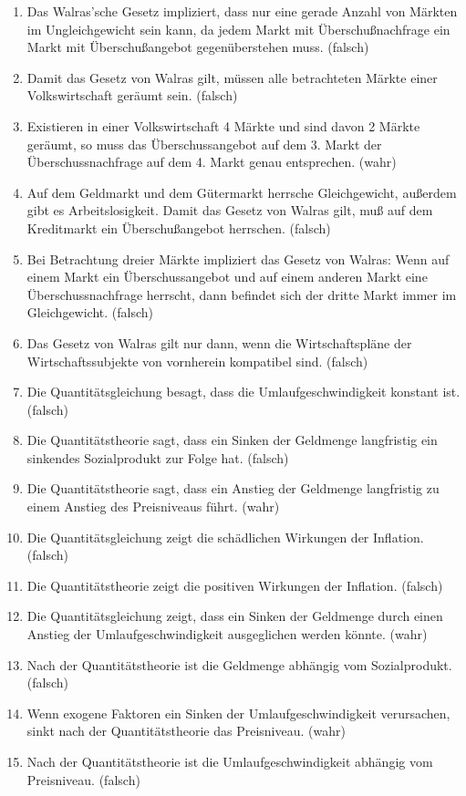 \documentclass{scrartcl}
\begin{document}
\begin{enumerate}
	\item Das Walras'sche Gesetz impliziert, dass nur eine gerade Anzahl von Märkten im Ungleichgewicht sein kann, da jedem Markt mit Überschußnachfrage ein Markt mit Überschußangebot gegenüberstehen muss. (falsch)
	\item Damit das Gesetz von Walras gilt, müssen alle betrachteten Märkte einer Volkswirtschaft geräumt sein. (falsch)
	\item Existieren in einer Volkswirtschaft 4 Märkte und sind davon 2 Märkte geräumt, so muss das Überschussangebot auf dem 3. Markt der Überschussnachfrage auf dem 4. Markt genau entsprechen. (wahr)
	\item Auf dem Geldmarkt und dem Gütermarkt herrsche Gleichgewicht, außerdem gibt es Arbeitslosigkeit. Damit das Gesetz von Walras gilt, muß auf dem Kreditmarkt ein Überschußangebot herrschen. (falsch)
	\item Bei Betrachtung dreier Märkte impliziert das Gesetz von Walras: Wenn auf einem Markt ein Überschussangebot und auf einem anderen Markt eine Überschussnachfrage herrscht, dann befindet sich der dritte Markt immer im Gleichgewicht. (falsch)
	\item Das Gesetz von Walras gilt nur dann, wenn die Wirtschaftspläne der Wirtschaftssubjekte von vornherein kompatibel sind. (falsch)
	\item Die Quantitätsgleichung besagt, dass die Umlaufgeschwindigkeit konstant ist. (falsch)
	\item Die Quantitätstheorie sagt, dass ein Sinken der Geldmenge langfristig ein sinkendes Sozialprodukt zur Folge hat. (falsch)
	\item Die Quantitätstheorie sagt, dass ein Anstieg der Geldmenge langfristig zu einem Anstieg des Preisniveaus führt. (wahr)
	\item Die Quantitätsgleichung zeigt die schädlichen Wirkungen der Inflation. (falsch)
	\item Die Quantitätstheorie zeigt die positiven Wirkungen der Inflation. (falsch)
	\item Die Quantitätsgleichung zeigt, dass ein Sinken der Geldmenge durch einen Anstieg der Umlaufgeschwindigkeit ausgeglichen werden könnte. (wahr)
	\item Nach der Quantitätstheorie ist die Geldmenge abhängig vom Sozialprodukt. (falsch)
	\item Wenn exogene Faktoren ein Sinken der Umlaufgeschwindigkeit verursachen, sinkt nach der Quantitätstheorie das Preisniveau. (wahr)
	\item Nach der Quantitätstheorie ist die Umlaufgeschwindigkeit abhängig vom Preisniveau. (falsch)

\end{enumerate}
\end{document}
